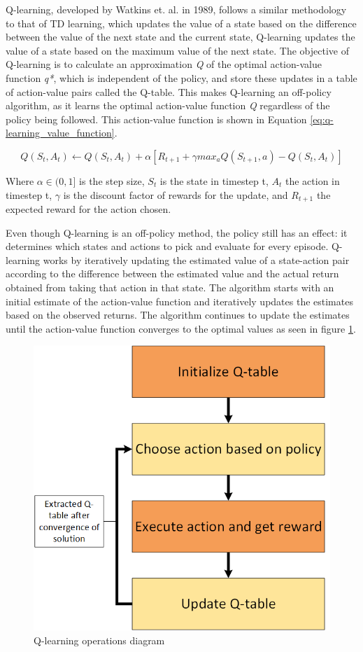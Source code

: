 Q-learning, developed by Watkins et. al. \cite{} in 1989, follows a similar methodology to that of TD learning, which updates the value of a state based on the difference between the value of the next state and the current state, Q-learning updates the value of a state based on the maximum value of the next state. The objective of Q-learning is to calculate an approximation \textit{Q} of the optimal action-value function \textit{q*}, which is independent of the policy, and store these updates in a table of action-value pairs called the Q-table. This makes Q-learning an off-policy algorithm, as it learns the optimal action-value function \textit{Q} regardless of the policy being followed. This action-value function is shown in Equation \ref{eq:q-learning_value_function}.

\begin{equation}
    \label{eq:q-learning_value_function}
    Q(S_t, A_t) \leftarrow Q(S_t, A_t) + \alpha [R_{t+1} + \gamma max_a Q(S_{t+1}, a) - Q(S_t, A_t)]
\end{equation}

Where $\alpha \in (0,1]$ is the step size, $S_t$ is the state in timestep t, $A_t$ the action in timestep t, $\gamma$ is the discount factor of rewards for the update, and $R_{t+1}$ the expected reward for the action chosen.

Even though Q-learning is an off-policy method, the policy still has an effect: it determines which states and actions to pick and evaluate for every episode. Q-learning works by iteratively updating the estimated value of a state-action pair according to the difference between the estimated value and the actual return obtained from taking that action in that state. The algorithm starts with an initial estimate of the action-value function and iteratively updates the estimates based on the observed returns. The algorithm continues to update the estimates until the action-value function converges to the optimal values as seen in figure \ref{fig:Q-learning}.

\begin{figure}[!h]
    \centering
    \includegraphics[width=.5\textwidth]{fig/rl/Q-learning.png}
    \caption{Q-learning operations diagram}
    \label{fig:Q-learning}
\end{figure}

